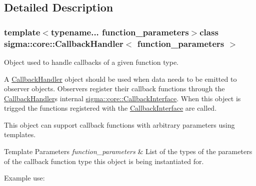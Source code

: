 \subsection{Detailed Description}
\subsubsection*{template$<$typename... function\+\_\+parameters$>$class sigma\+::core\+::\+Callback\+Handler$<$ function\+\_\+parameters $>$}

Object used to handle callbacks of a given function type. 

A \hyperlink{classsigma_1_1core_1_1_callback_handler}{Callback\+Handler} object should be used when data needs to be emitted to observer objects. Observers register their callback functions through the \hyperlink{classsigma_1_1core_1_1_callback_handler}{Callback\+Handler}\textquotesingle{}s internal \hyperlink{classsigma_1_1core_1_1_callback_interface}{sigma\+::core\+::\+Callback\+Interface}. When this object is trigged the functions registered with the \hyperlink{classsigma_1_1core_1_1_callback_interface}{Callback\+Interface} are called.

This object can support callback functions with arbitrary parameters using templates.


\begin{DoxyTemplParams}{Template Parameters}
{\em function\+\_\+parameters} & List of the types of the parameters of the callback function type this object is being instantiated for.\\
\hline
\end{DoxyTemplParams}
Example use\+:


